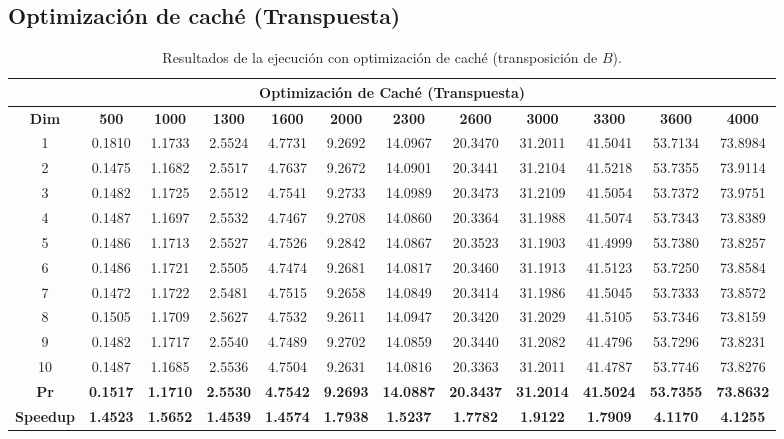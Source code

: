 \documentclass{article}
\begin{document}

\subsection{Optimización de caché (Transpuesta)}

\begin{table}[H]
\centering

\tiny
\begin{tabular}{|c|c|c|c|c|c|c|c|c|c|c|c|}
\hline
\multicolumn{12}{|c|}{\textbf{Optimización de Caché (Transpuesta)}} \\
\hline
\textbf{Dim} & \textbf{500} & \textbf{1000} & \textbf{1300} & \textbf{1600} & \textbf{2000} & \textbf{2300} & \textbf{2600} & \textbf{3000} & \textbf{3300} & \textbf{3600} & \textbf{4000} \\
\hline
1  & 0.1810 & 1.1733 & 2.5524 & 4.7731 & 9.2692 & 14.0967 & 20.3470 & 31.2011 & 41.5041 & 53.7134 & 73.8984 \\
2  & 0.1475 & 1.1682 & 2.5517 & 4.7637 & 9.2672 & 14.0901 & 20.3441 & 31.2104 & 41.5218 & 53.7355 & 73.9114 \\
3  & 0.1482 & 1.1725 & 2.5512 & 4.7541 & 9.2733 & 14.0989 & 20.3473 & 31.2109 & 41.5054 & 53.7372 & 73.9751 \\
4  & 0.1487 & 1.1697 & 2.5532 & 4.7467 & 9.2708 & 14.0860 & 20.3364 & 31.1988 & 41.5074 & 53.7343 & 73.8389 \\
5  & 0.1486 & 1.1713 & 2.5527 & 4.7526 & 9.2842 & 14.0867 & 20.3523 & 31.1903 & 41.4999 & 53.7380 & 73.8257 \\
6  & 0.1486 & 1.1721 & 2.5505 & 4.7474 & 9.2681 & 14.0817 & 20.3460 & 31.1913 & 41.5123 & 53.7250 & 73.8584 \\
7  & 0.1472 & 1.1722 & 2.5481 & 4.7515 & 9.2658 & 14.0849 & 20.3414 & 31.1986 & 41.5045 & 53.7333 & 73.8572 \\
8  & 0.1505 & 1.1709 & 2.5627 & 4.7532 & 9.2611 & 14.0947 & 20.3420 & 31.2029 & 41.5105 & 53.7346 & 73.8159 \\
9  & 0.1482 & 1.1717 & 2.5540 & 4.7489 & 9.2702 & 14.0859 & 20.3440 & 31.2082 & 41.4796 & 53.7296 & 73.8231 \\
10 & 0.1487 & 1.1685 & 2.5536 & 4.7504 & 9.2631 & 14.0816 & 20.3363 & 31.2011 & 41.4787 & 53.7746 & 73.8276 \\
\hline
\textbf{Pr} & \textbf{0.1517} & \textbf{1.1710} & \textbf{2.5530} & \textbf{4.7542} & \textbf{9.2693} & \textbf{14.0887} & \textbf{20.3437} & \textbf{31.2014} & \textbf{41.5024} & \textbf{53.7355} & \textbf{73.8632} \\
\hline
\textbf{Speedup} & \textbf{1.4523} & \textbf{1.5652} & \textbf{1.4539} & \textbf{1.4574} & \textbf{1.7938} & \textbf{1.5237} & \textbf{1.7782} & \textbf{1.9122} & \textbf{1.7909} & \textbf{4.1170} & \textbf{4.1255} \\
\hline
\end{tabular}
\caption{Resultados de la ejecución con optimización de caché (transposición de $B$).}
\label{tab:memoria}
\end{table}
\end{document}
